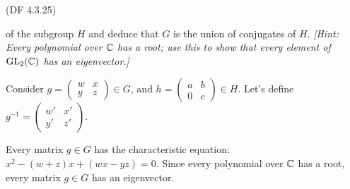 \begin{problem}{(\textsf{DF 4.3.25})}
\begin{enumalph}
      of the subgroup $H$ and deduce that $G$ is the union of conjugates of $H$.
      \emph{[Hint: Every polynomial over $\mathbb{C}$ has a root;
        use this to show that every element of $\mathrm{GL}_2(\mathbb{C})$ has an eigenvector.]}
      \begin{Answer}
        Consider $g = \begin{pmatrix}
          w & x \\
          y & z
        \end{pmatrix} \in G$, and $h = \begin{pmatrix}
          a & b \\
          0 & c
        \end{pmatrix} \in H$.
        Let's define $g^{-1} = \begin{pmatrix}
          w' & x' \\
          y' & z'
        \end{pmatrix}$.
        
        \noindent
        Every matrix $g \in G$ has the characteristic equation:
        $x^2 - (w + z) x + (wx - yz) = 0$.
        Since every polynomial over $\mathbb{C}$ has a root, every matrix $g \in G$ has an eigenvector.

      \end{Answer}
  \end{enumalph}
\end{problem}
